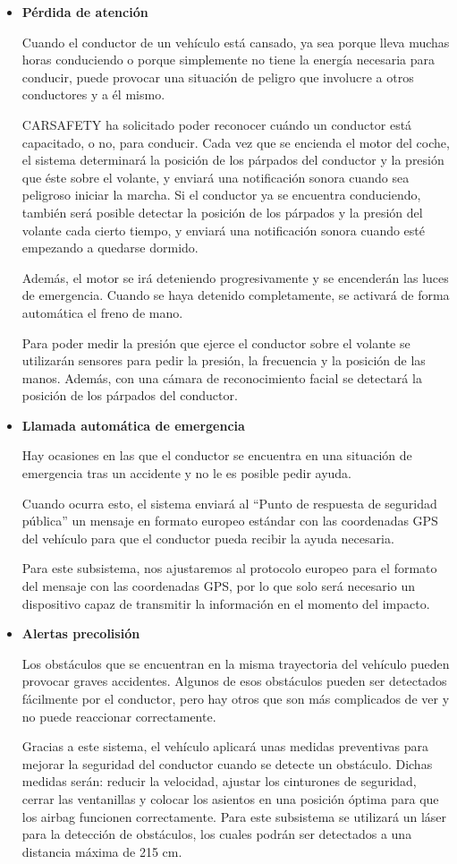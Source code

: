 \begin{itemize}[-]
\item \textbf{Pérdida de atención}
\par Cuando el conductor de un vehículo está cansado, ya sea porque lleva muchas horas conduciendo o porque simplemente no tiene la energía necesaria para conducir, puede provocar una situación de peligro que involucre a otros conductores y a él mismo.
\par CARSAFETY ha solicitado poder reconocer cuándo un conductor está capacitado, o no, para conducir. Cada vez que se encienda el motor del coche, el sistema determinará la posición de los párpados del conductor y la presión que éste sobre el volante, y enviará una notificación sonora cuando sea peligroso iniciar la marcha. Si el conductor ya se encuentra conduciendo, también será posible detectar la posición de los párpados y la presión del volante cada cierto tiempo, y enviará una notificación sonora cuando esté empezando a quedarse dormido.
\par Además, el motor se irá deteniendo progresivamente y se encenderán las luces de emergencia. Cuando se haya detenido completamente, se activará de forma automática el freno de mano. 
\par Para poder medir la presión que ejerce el conductor sobre el volante se utilizarán sensores para pedir la presión, la frecuencia y la posición de las manos. Además, con una cámara de reconocimiento facial se detectará la posición de los párpados del conductor. 
\item \textbf{Llamada automática de emergencia}
\par Hay ocasiones en las que el conductor se encuentra en una situación de emergencia tras un accidente y no le es posible pedir ayuda.
\par Cuando ocurra esto, el sistema enviará al “Punto de respuesta de seguridad pública” un mensaje en formato europeo estándar con las coordenadas GPS del vehículo para que el conductor pueda recibir la ayuda necesaria. 
\par Para este subsistema, nos ajustaremos al protocolo europeo para el formato del mensaje con las coordenadas GPS, por lo que solo será necesario un dispositivo capaz de transmitir la información en el momento del impacto. 
\item \textbf{Alertas precolisión}
\par Los obstáculos que se encuentran en la misma trayectoria del vehículo pueden provocar graves accidentes. Algunos de esos obstáculos pueden ser detectados fácilmente por el conductor, pero hay otros que son más complicados de ver y no puede reaccionar correctamente.
\par Gracias a este sistema, el vehículo aplicará unas medidas preventivas para mejorar la seguridad del conductor cuando se detecte un obstáculo. Dichas medidas serán: reducir la velocidad, ajustar los cinturones de seguridad, cerrar las ventanillas y colocar los asientos en una posición óptima para que los airbag funcionen correctamente. Para este subsistema se utilizará un láser para la detección de obstáculos, los cuales podrán ser detectados a una distancia máxima de 215 cm.
\end{itemize}

